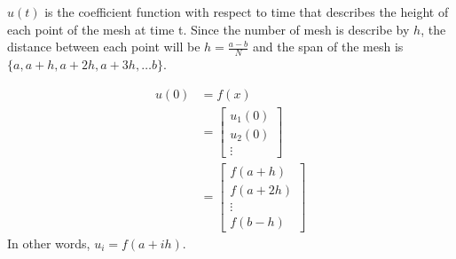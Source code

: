 \documentclass{article}
\begin{document}
$u(t)$ is the coefficient function with respect to time that describes the height of each point of the mesh at time t. Since the number of mesh is describe by $h$, the distance between each point will be $h = \frac{a - b}{N}$ and the span of the mesh is $\{a, a+h, a+2h, a+3h, \dots b\}$.

\begin{align}
  u(0) &= f(x) \\
      &= \begin{bmatrix}
        u_1(0) \\ u_2(0) \\ \vdots
      \end{bmatrix} \\
      &= \begin{bmatrix}
        f(a+h) \\ f(a+2h) \\ \vdots \\ f(b-h)
      \end{bmatrix}
\end{align}
In other words, $u_i = f(a + ih)$.
\end{document}
